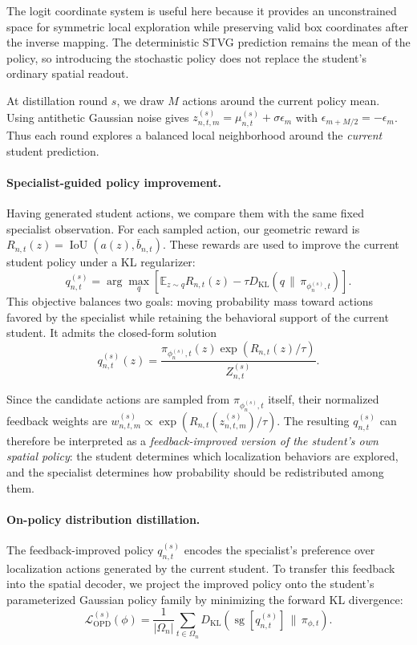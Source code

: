 \documentclass[10pt,twocolumn,letterpaper]{article}
\begin{document}
The logit coordinate system is useful here because it provides an unconstrained
space for symmetric local exploration while preserving valid box coordinates
after the inverse mapping. The deterministic STVG prediction remains the mean
of the policy, so introducing the stochastic policy does not replace the
student's ordinary spatial readout.

At distillation round $s$, we draw $M$ actions around the current policy mean.
Using antithetic Gaussian noise gives
$z_{n,t,m}^{(s)}=\mu_{n,t}^{(s)}+\sigma\epsilon_m$ with
$\epsilon_{m+M/2}=-\epsilon_m$.
Thus each round explores a balanced local neighborhood around the
\emph{current} student prediction.

\paragraph{Specialist-guided policy improvement.}
Having generated student actions, we compare them with the same fixed
specialist observation. For each sampled action, our geometric reward is
$R_{n,t}(z)=\operatorname{IoU}(a(z),\bar b_{n,t})$.
These rewards are used to improve the current student policy under a
KL regularizer:
\begin{equation}
	q_{n,t}^{(s)}
	=
	\arg\max_q
	\left[
	\mathbb E_{z\sim q} R_{n,t}(z)
	-
	\tau
	D_{\mathrm{KL}}
	\!\left(
	q\,\|\,\pi_{\phi_n^{(s)},t}
	\right)
	\right].
	\label{eq:policy-improvement}
\end{equation}
This objective balances two goals: moving probability mass toward actions
favored by the specialist while retaining the behavioral support of the
current student. It admits the closed-form solution
\begin{equation}
	q_{n,t}^{(s)}(z)
	=
	\frac{
		\pi_{\phi_n^{(s)},t}(z)
		\exp\!\left(R_{n,t}(z)/\tau\right)
	}{
		Z_{n,t}^{(s)}
	} .
	\label{eq:improved-policy}
\end{equation}

Since the candidate actions are sampled from
$\pi_{\phi_n^{(s)},t}$ itself, their normalized feedback weights are
$w_{n,t,m}^{(s)}
\propto
\exp(R_{n,t}(z_{n,t,m}^{(s)})/\tau)$.
The resulting $q_{n,t}^{(s)}$ can therefore be interpreted as a
\emph{feedback-improved version of the student's own spatial policy}: the
student determines which localization behaviors are explored, and the
specialist determines how probability should be redistributed among them.


\paragraph{On-policy distribution distillation.}
The feedback-improved policy $q_{n,t}^{(s)}$ encodes the
specialist's preference over localization actions generated
by the current student. To transfer this feedback into the
spatial decoder, we project the improved policy onto the
student's parameterized Gaussian policy family by minimizing
the forward KL divergence:
\begin{equation}
	\mathcal L_{\mathrm{OPD}}^{(s)}(\phi)
	=
	\frac{1}{|\Omega_n|}
	\sum_{t\in\Omega_n}
	D_{\mathrm{KL}}
	\left(
	\operatorname{sg}[q_{n,t}^{(s)}]
	\,\|\, \pi_{\phi,t}
	\right).
	\label{eq:opd-objective}
\end{equation}
\end{document}
